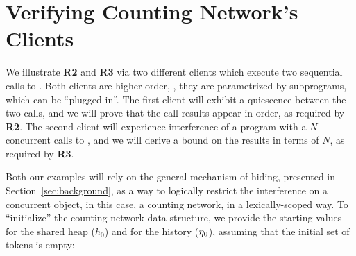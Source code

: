 
\section{Verifying Counting Network's Clients}
\label{sec:qclients}


We illustrate \textbf{R2} and \textbf{R3} via two different clients
which execute two sequential calls to . Both clients
are higher-order, \ie, they are parametrized by subprograms, which can
be ``plugged in''. 
%
The first client will exhibit a quiescence between the two calls, and
we will prove that the call results appear in order, as required by
\textbf{R2}. The second client will experience interference of a
program with a $N$ concurrent calls to , and we will
derive a bound on the results in terms of $N$, as required by
\textbf{R3}.

Both our examples will rely on the general mechanism of hiding,
presented in Section~\ref{sec:background}, as a way to logically restrict the
interference on a concurrent object, in this case, a counting network,
in a lexically-scoped way.
%
To ``initialize'' the counting network data structure, we provide the
starting values for the shared heap ($h_0$) and for the history
($\eta_0$), assuming that the initial set of tokens is empty:
%
%

